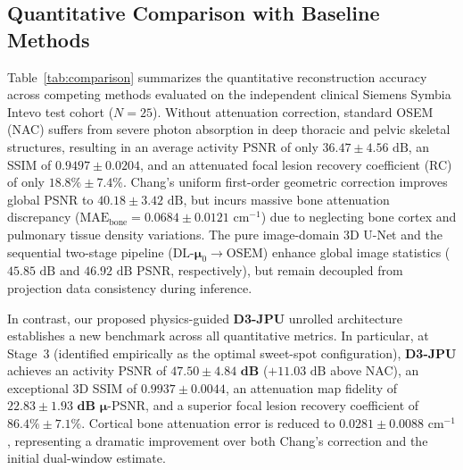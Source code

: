 \documentclass[11pt, a4paper]{article}
\begin{document}
\subsection{Quantitative Comparison with Baseline Methods}
Table~\ref{tab:comparison} summarizes the quantitative reconstruction accuracy across competing methods evaluated on the independent clinical Siemens Symbia Intevo test cohort ($N = 25$). Without attenuation correction, standard OSEM (NAC) suffers from severe photon absorption in deep thoracic and pelvic skeletal structures, resulting in an average activity PSNR of only $36.47 \pm 4.56\text{ dB}$, an SSIM of $0.9497 \pm 0.0204$, and an attenuated focal lesion recovery coefficient (RC) of only $18.8\% \pm 7.4\%$. Chang's uniform first-order geometric correction \cite{ref11} improves global PSNR to $40.18 \pm 3.42\text{ dB}$, but incurs massive bone attenuation discrepancy ($\text{MAE}_{\text{bone}} = 0.0684 \pm 0.0121\text{ cm}^{-1}$) due to neglecting bone cortex and pulmonary tissue density variations. The pure image-domain 3D U-Net \cite{ref18} and the sequential two-stage pipeline ($\text{DL-}\boldsymbol{\mu}_0 \to \text{OSEM}$) \cite{ref17} enhance global image statistics ($45.85\text{ dB}$ and $46.92\text{ dB}$ PSNR, respectively), but remain decoupled from projection data consistency during inference.

In contrast, our proposed physics-guided \textbf{D3-JPU} unrolled architecture establishes a new benchmark across all quantitative metrics. In particular, at Stage~3 (identified empirically as the optimal sweet-spot configuration), \textbf{D3-JPU} achieves an activity PSNR of $\mathbf{47.50 \pm 4.84\text{ dB}}$ ($+11.03\text{ dB}$ above NAC), an exceptional 3D SSIM of $\mathbf{0.9937 \pm 0.0044}$, an attenuation map fidelity of $\mathbf{22.83 \pm 1.93\text{ dB}}$ $\boldsymbol{\mu}$-PSNR, and a superior focal lesion recovery coefficient of $\mathbf{86.4\% \pm 7.1\%}$. Cortical bone attenuation error is reduced to $0.0281 \pm 0.0088\text{ cm}^{-1}$, representing a dramatic improvement over both Chang's correction and the initial dual-window estimate.
\end{document}
